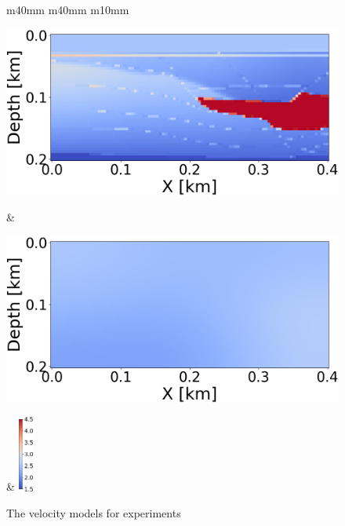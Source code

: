\begin{figure}[t]
    \centering
    \begin{tabular}{m{40mm} m{40mm} m{10mm}}
        \begin{minipage}[b]{\linewidth}
            \centering
            \includegraphics[width=\linewidth]{public/true}
            \vspace{-9mm}
            \caption*{}
            \vspace{1mm}
        \end{minipage} &
        \hspace{-5mm}
        \begin{minipage}[b]{\linewidth}
            \centering
            \includegraphics[width=\linewidth]{public/initial}
            \vspace{-9mm}
            \caption*{}
            \vspace{1mm}
        \end{minipage} &
        \hspace{-8mm}
        \includegraphics[height=25mm]{public/color-bar}
    \end{tabular}
    \vspace{-4mm}
    \caption{The velocity models for experiments}
    \vspace{-5mm}
    \label{fig:experiment-data}
\end{figure}
